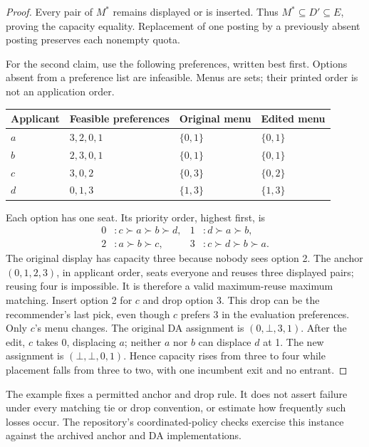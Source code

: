 \begin{proof}
Every pair of $M^*$ remains displayed or is inserted. Thus
$M^*\subseteq D'\subseteq E$, proving the capacity equality. Replacement of
one posting by a previously absent posting preserves each nonempty quota.

For the second claim, use the following preferences, written best first.
Options absent from a preference list are infeasible. Menus are sets; their
printed order is not an application order.
\begin{center}\small
\begin{tabular}{@{}llll@{}}\toprule
Applicant & Feasible preferences & Original menu & Edited menu\\\midrule
$a$ & $3,2,0,1$ & $\{0,1\}$ & $\{0,1\}$\\
$b$ & $2,3,0,1$ & $\{0,1\}$ & $\{0,1\}$\\
$c$ & $3,0,2$   & $\{0,3\}$ & $\{0,2\}$\\
$d$ & $0,1,3$   & $\{1,3\}$ & $\{1,3\}$\\\bottomrule
\end{tabular}\end{center}
Each option has one seat. Its priority order, highest first, is
\[
\begin{aligned}
0 &: c\succ a\succ b\succ d, & 1 &: d\succ a\succ b,\\
2 &: a\succ b\succ c,       & 3 &: c\succ d\succ b\succ a.
\end{aligned}
\]
The original display has capacity three because nobody sees option 2.
The anchor $(0,1,2,3)$, in applicant order, seats everyone and reuses three
displayed pairs; reusing four is impossible. It is therefore a valid
maximum-reuse maximum matching. Insert option 2 for $c$ and drop option 3.
This drop can be the recommender's last pick, even though $c$ prefers 3 in
the evaluation preferences. Only $c$'s menu changes. The original DA
assignment is $(0,\bot,3,1)$. After the edit, $c$ takes 0, displacing $a$;
neither $a$ nor $b$ can displace $d$ at 1. The new assignment is
$(\bot,\bot,0,1)$. Hence capacity rises from three to four while placement
falls from three to two, with one incumbent exit and no entrant.
\end{proof}
The example fixes a permitted anchor and drop rule. It does not assert failure
under every matching tie or drop convention, or estimate how frequently such
losses occur. The repository's coordinated-policy checks exercise this
instance against the archived anchor and DA implementations.

